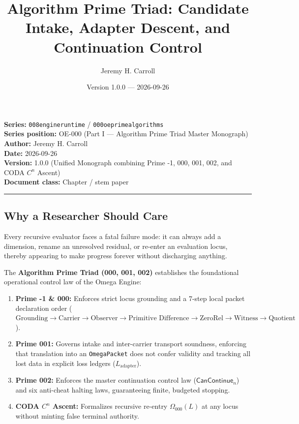 \documentclass[
  11pt,
]{article}
\title{Algorithm Prime Triad: Candidate Intake, Adapter Descent, and
Continuation Control}
\author{Jeremy H. Carroll}
\date{Version 1.0.0 --- 2026-09-26}
\providecommand{\tightlist}{%
  \setlength{\itemsep}{0pt}\setlength{\parskip}{0pt}}
\renewcommand{\_}{\origunderscore\allowbreak}
\begin{document}
\makeatletter
\begin{center}
{\LARGE \@title\par}
\vspace{0.8em}
{\normalsize \@author\par}
\vspace{0.5em}
{\small \@date\par}
\end{center}
\makeatother

{
\hypersetup{linkcolor=}
\setcounter{tocdepth}{3}
\tableofcontents
}
\textbf{Series:} \texttt{008\_engine\_runtime} /
\texttt{000\_oe\_prime\_algorithms}\\
\textbf{Series position:} OE-000 (Part I --- Algorithm Prime Triad
Master Monograph)\\
\textbf{Author:} Jeremy H. Carroll\\
\textbf{Date:} 2026-09-26\\
\textbf{Version:} 1.0.0 (Unified Monograph combining Prime -1, 000, 001,
002, and CODA \(C^n\) Ascent)\\
\textbf{Document class:} Chapter / stem paper

\begin{center}\rule{0.5\linewidth}{0.5pt}\end{center}

\subsection{Why a Researcher Should
Care}\label{why-a-researcher-should-care}

Every recursive evaluator faces a fatal failure mode: it can always add
a dimension, rename an unresolved residual, or re-enter an evaluation
locus, thereby appearing to make progress forever without discharging
anything.

The \textbf{Algorithm Prime Triad (000, 001, 002)} establishes the
foundational operational control law of the Omega Engine:

\begin{enumerate}
\def\labelenumi{\arabic{enumi}.}
\tightlist
\item
  \textbf{Prime -1 \& 000:} Enforces strict locus grounding and a 7-step
  local packet declaration order
  (\(\text{Grounding} \to \text{Carrier} \to \text{Observer} \to \text{Primitive Difference} \to \text{ZeroRel} \to \text{Witness} \to \text{Quotient}\)).
\item
  \textbf{Prime 001:} Governs intake and inter-carrier transport
  soundness, enforcing that translation into an \texttt{OmegaPacket}
  does not confer validity and tracking all lost data in explicit loss
  ledgers (\(L_{\text{adapter}}\)).
\item
  \textbf{Prime 002:} Enforces the master continuation control law
  (\(\mathsf{CanContinue}_n\)) and six anti-cheat halting laws,
  guaranteeing finite, budgeted stopping.
\item
  \textbf{CODA \(C^n\) Ascent:} Formalizes recursive re-entry
  \(\Omega_{000}(L)\) at any locus without minting false terminal
  authority.
\end{enumerate}
\end{document}
